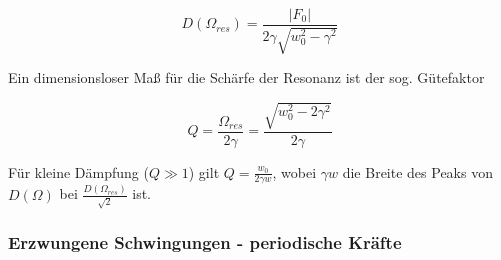 \documentclass[10pt, letterpaper]{article}
\begin{document}
\[D(\Omega_{res}) = \frac{|F_0|}{2\gamma\sqrt{w_0^2-\gamma^2}}\]

Ein dimensionsloser Maß für die Schärfe der Resonanz ist der sog. Gütefaktor

\[Q = \frac{\Omega_{res}}{2\gamma} = \frac{\sqrt{w_0^2-2\gamma^2}}{2\gamma}\]

Für kleine Dämpfung ($Q \gg 1$) gilt $Q = \frac{w_0}{2\gamma w}$, wobei $\gamma w$ die Breite des Peaks von $D(\Omega)$ bei $\frac{D(\Omega_{res})}{\sqrt{2}}$ ist.



\subsubsection*{Erzwungene Schwingungen - periodische Kräfte}
\end{document}

